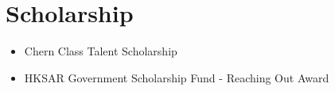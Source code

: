 \documentclass[10pt,a4paper,roman]{moderncv}        %
\newcommand{\cvreference}[5]{%
    \textbf{#1}\hfill%
    \ifthenelse{\equal{#5}{}}{}{\emailsymbol~\texttt{#5}\newline}%
    \ifthenelse{\equal{#2}{}}{}{\addresssymbol~#2\newline}%
    \ifthenelse{\equal{#3}{}}{}{#3\newline}%
    \ifthenelse{\equal{#4}{}}{}{#4}%
}
\begin{document}
\section{Scholarship}
\begin{itemize}
  \item Chern Class Talent Scholarship
  \item HKSAR Government Scholarship Fund - Reaching Out Award
\end{itemize}




\end{document}
